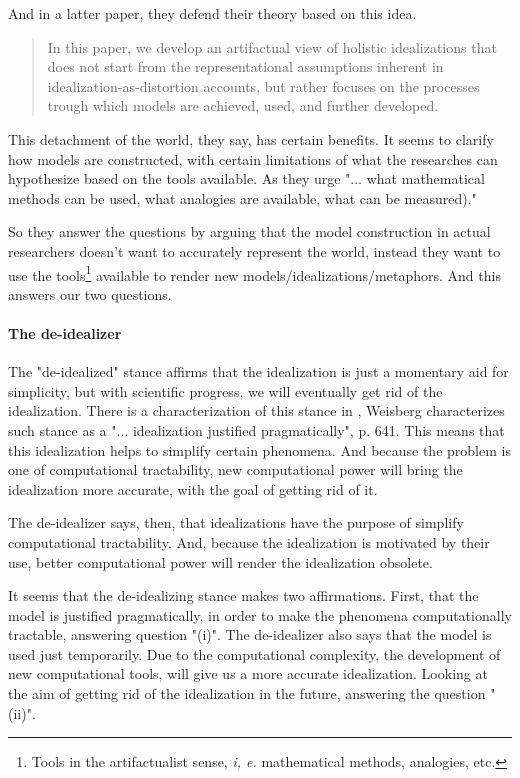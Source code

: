 And in a latter paper, they defend their theory based on this idea.

\begin{quote}
	In this paper, we develop an artifactual view of holistic idealizations that does not start from the representational assumptions inherent in idealization-as-distortion accounts, but rather focuses on the processes trough which models are achieved, used, and further developed. \parencite[][p. 50]{Carrillo2022}
\end{quote}

This detachment of the world, they say, has certain benefits.
It seems to clarify how models are constructed, with certain limitations of what the researches can hypothesize based on the tools available.
As they urge "$\ldots$ what  mathematical methods can be used, what analogies are available, what can be measured)." \parencite[][p. 9]{Carrillo2021-CARAAP-12}

So they answer the questions by arguing that the model construction in actual researchers doesn't want to accurately represent the world, instead they want to use the tools\footnote{Tools in the artifactualist sense, \emph{i, e.} mathematical methods, analogies, etc.} available to render new models/idealizations/metaphors.
And this answers our two questions.

\paragraph{The de-idealizer}

The "de-idealized" stance affirms that the idealization is just a momentary aid for simplicity, but with scientific progress, we will eventually get rid of the idealization.
There is a characterization of this stance in \parencite{Weisberg2007}, Weisberg characterizes such stance as a "$\ldots$ idealization justified pragmatically", p. 641.
This means that this idealization helps to simplify certain phenomena.
And because the problem is one of computational tractability, new computational power will bring the idealization more accurate, with the goal of getting rid of it.

The de-idealizer says, then, that idealizations have the purpose of simplify computational tractability.
And, because the idealization is motivated by their use, better computational power will render the idealization obsolete.

It seems that the de-idealizing stance makes two affirmations.
First, that the model is justified pragmatically, in order to make the phenomena computationally tractable, answering question "(i)".
The de-idealizer also says that the model is used just temporarily.
Due to the computational complexity, the development of new computational tools, will give us a more accurate idealization.
Looking at the aim of getting rid of the idealization in the future, answering the question "(ii)".

